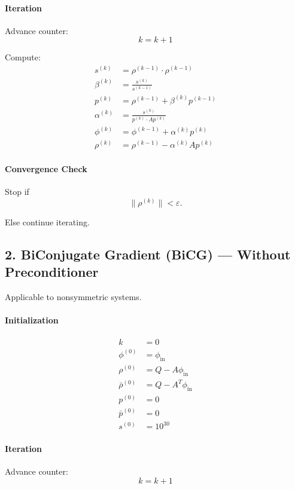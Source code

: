 \documentclass[11pt]{article}
\begin{document}
\paragraph{Iteration}
Advance counter:
\[k = k + 1\]

Compute:
\begin{align*}
s^{(k)} &= \rho^{(k-1)} \cdot \rho^{(k-1)} \\
\beta^{(k)} &= \frac{s^{(k)}}{s^{(k-1)}} \\
p^{(k)} &= \rho^{(k-1)} + \beta^{(k)} p^{(k-1)} \\
\alpha^{(k)} &= \frac{s^{(k)}}{p^{(k)} \cdot A p^{(k)}} \\
\phi^{(k)} &= \phi^{(k-1)} + \alpha^{(k)} p^{(k)} \\
\rho^{(k)} &= \rho^{(k-1)} - \alpha^{(k)} A p^{(k)}
\end{align*}

\paragraph{Convergence Check}
Stop if
\[\|\rho^{(k)}\| < \varepsilon.\]

Else continue iterating.

\subsection{2. BiConjugate Gradient (BiCG) --- Without Preconditioner}

Applicable to nonsymmetric systems.

\paragraph{Initialization}
\begin{align*}
k &= 0 \\
\phi^{(0)} &= \phi_{\text{in}} \\
\rho^{(0)} &= Q - A\phi_{\text{in}} \\
\bar{\rho}^{(0)} &= Q - A^{T}\phi_{\text{in}} \\
p^{(0)} &= 0 \\
\bar{p}^{(0)} &= 0 \\
s^{(0)} &= 10^{30}
\end{align*}

\paragraph{Iteration}
Advance counter:
\[k = k+1\]
\end{document}
